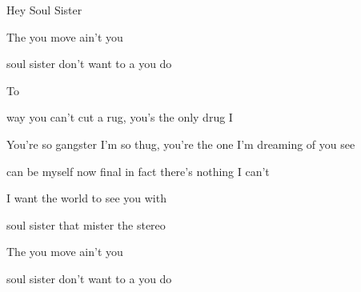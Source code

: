 \begin{SBSong}{Hey Soul Sister}
\begin{SBChorus}
    The  you move ain't  you 

     soul sister  don't want to  a   you do  

    To
  \end{SBChorus}
  \CBPageBrk
  \begin{SBVerse}
     way you can't cut a rug,  you's the only drug I 

    You're so gangster I'm so thug, you're the  one I'm dreaming of you see

     can be myself now final in fact there's nothing I can't 
    
    I want the world to see you  with 
  \end{SBVerse}
  \begin{SBChorus}
     soul sister  that mister   the  stereo

    The  you move ain't  you 

     soul sister  don't want to  a   you do 
  \end{SBChorus}
\end{SBSong}